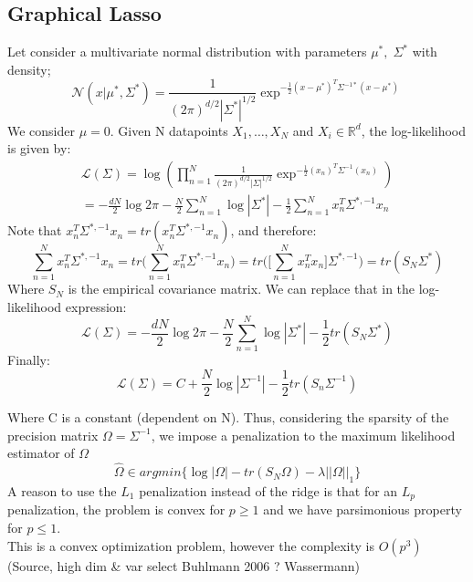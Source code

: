 \documentclass[12pt]{article}
\let\bb\mathbb       %
\def\RR{{\bb R}}\def\ZZ{{\bb Z}}\def\FF{{\bb F}}\def\DD{{\bb D}}
\def\bb{\mathbb}
\def\hat{\widehat}
\begin{document}
\subsection{Graphical Lasso}
Let consider a multivariate normal distribution with parameters $\mu^*,\; \Sigma^*$ with density;
\begin{equation}
\mathcal N(x|\mu^*,\Sigma^*)
=\frac{1}{(2\pi)^{d/2}|\Sigma^*|^{1/2}}\exp^{-\frac{1}{2}(x-\mu^*)^T\Sigma^{-1*}(x-\mu^*)}
\end{equation}
We consider $\mu=0$. Given N datapoints $X_1,\dots,X_N$ and $X_i \in \RR^d$, the log-likelihood is given by:
\begin{equation}
\begin{split}
\mathcal{L}(\Sigma)=\log\left(\prod_{n=1}^N\frac{1}{(2\pi)^{d/2}|\Sigma|^{1/2}}\exp^{-\frac{1}{2}(x_n)^T\Sigma^{-1}(x_n)}\right)\\
=-\frac{dN}{2}\log 2\pi - \frac{N}{2}\sum_{n=1}^N\log |\Sigma^*|- \frac{1}{2}\sum_{n=1}^N x_n^T\Sigma^{*,-1}x_n
\end{split}
\end{equation}
Note that $x_n^T\Sigma^{*,-1}x_n=tr(x_n^T\Sigma^{*,-1}x_n)$, and therefore:
\begin{equation}
\sum_{n=1}^N x_n^T\Sigma^{*,-1}x_n=tr\big(\sum_{n=1}^N x_n^T\Sigma^{*,-1}x_n\big)=tr\Big(\big[\sum_{n=1}^N x_n^Tx_n\big]\Sigma^{*,-1}\Big)=tr(S_N\Sigma^*)
\end{equation}
Where $S_N$ is the empirical covariance matrix. We can replace that in the log-likelihood expression:
\begin{equation}
\mathcal{L}(\Sigma)=-\frac{dN}{2}\log 2\pi - \frac{N}{2}\sum_{n=1}^N\log |\Sigma^*|- \frac{1}{2}tr(S_N\Sigma^*)
\end{equation}
Finally:
\begin{equation}
\mathcal{L}(\Sigma)=C+\frac{N}{2}\log|\Sigma^{-1}|-\frac{1}{2} tr(S_n\Sigma^{-1})
\end{equation}

Where C is a constant (dependent on N). Thus, considering the sparsity of the precision matrix $\Omega=\Sigma^{-1}$, we impose a penalization to the maximum likelihood estimator of $\Omega$
\begin{equation}
\hat\Omega\in argmin\big\{ \log|\Omega|-tr(S_N\Omega)-\lambda||\Omega||_1   \big\}
\end{equation}
A reason to use the $L_1$ penalization instead of the ridge is that for an $L_p$ penalization, the problem is convex for $p\geq 1$ and we have parsimonious property for $p\leq 1$.\\
This is a convex optimization problem, however the complexity is $O(p^3)$ (Source, high dim \& var select Buhlmann 2006 ? Wassermann)
\end{document}
